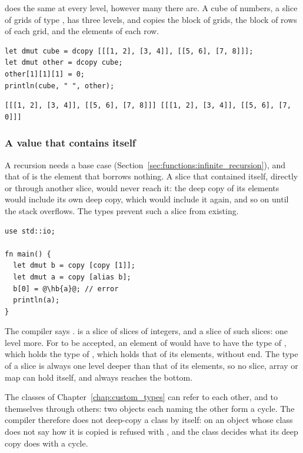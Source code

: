  does the same at every level, however many there are. A cube of
numbers, a slice of grids of type \token{[[[i32]]]}, has three levels, and
 copies the block of grids, the block of rows of each grid,
and the elements of each row.

\begin{lstlisting}[style=coloredverbatim]
let dmut cube = dcopy [[[1, 2], [3, 4]], [[5, 6], [7, 8]]];
let dmut other = dcopy cube;
other[1][1][1] = 0;
println(cube, " ", other);
\end{lstlisting}
\vspace{-10pt}%
\begin{lstlisting}[style=bashVerb]
[[[1, 2], [3, 4]], [[5, 6], [7, 8]]] [[[1, 2], [3, 4]], [[5, 6], [7, 0]]]
\end{lstlisting}

\subsubsection*{A value that contains itself}

A recursion needs a base case (Section~\ref{sec:functions:infinite_recursion}),
and that of  is the element that borrows nothing. A slice that
contained itself, directly or through another slice, would never reach it: the
deep copy of its elements would include its own deep copy, which would include
it again, and so on until the stack overflows. The types prevent such a slice
from existing.

\begin{lstlisting}[style=coloredverbatimError, escapechar=@, caption=A slice that would contain itself]
use std::io;

fn main() {
  let dmut b = copy [copy [1]];
  let dmut a = copy [alias b];
  b[0] = @\hb{a}@; // error
  println(a);
}
\end{lstlisting}

The compiler says .  is a slice of slices of integers, and 
a slice of such slices: one level more. For  to be accepted,
an element of  would have to have the type of , which holds
the type of , which holds that of its elements, without end. The type
of a slice is always one level deeper than that of its elements, so no slice,
array or map can hold itself, and  always reaches the bottom.

The classes of Chapter~\ref{chap:custom_types} can refer to each other, and to
themselves through others: two objects each naming the other form a cycle. The
compiler therefore does not deep-copy a class by itself:  on an
object whose class does not say how it is copied is refused with
, and the class decides what its deep copy does with a
cycle.

